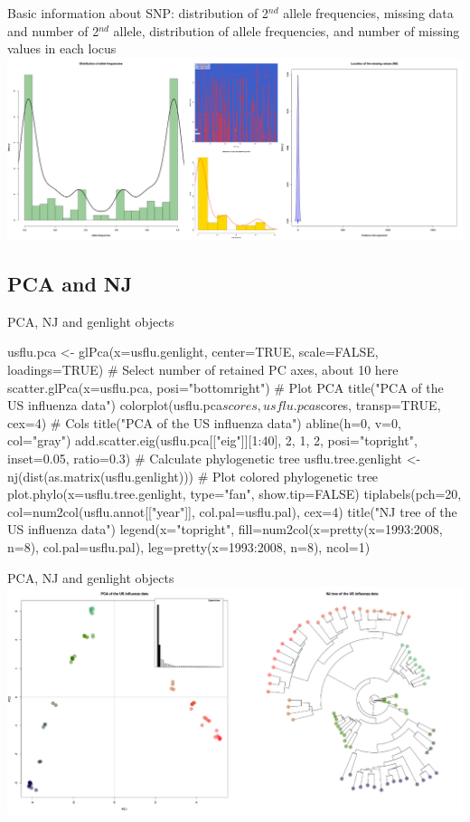 \documentclass[compress, ucs, xelatex, 11pt, xcolor=svgnames,
	hyperref={
		bookmarks=true,
		unicode=true,
		colorlinks=true,
		pdftitle={Molecular data in R},
		plainpages=false,
		pdfauthor={Vojtech Zeisek},
		pdfsubject={Course about phylogeny and evolution in R},
		pdfcreator={XeLaTeX},
		pdfkeywords={R, evolution, phylogeny, molecular data},
		linkcolor=Tomato,
		anchorcolor=SaddleBrown,
		citecolor=Goldenrod,
		filecolor=DarkMagenta,
		menucolor=Sienna,
		urlcolor=DarkTurquoise,
		pdftex},
	url={hyphens, lowtilde} %
	]{beamer}
\begin{document}
\begin{frame}{Basic information about SNP: distribution of 2$^{nd}$ allele frequencies, missing data and number of 2$^{nd}$ allele, distribution of allele frequencies, and number of missing values in each locus}
	\includegraphics[width=\textwidth]{flu_alleles.png}
\end{frame}

\subsection{PCA and NJ}

\begin{frame}[fragile]{PCA, NJ and genlight objects}
	\begin{spluscode}
    usflu.pca <- glPca(x=usflu.genlight, center=TRUE, scale=FALSE,
      loadings=TRUE) # Select number of retained PC axes, about 10 here
    scatter.glPca(x=usflu.pca, posi="bottomright") # Plot PCA
    title("PCA of the US influenza data")
    colorplot(usflu.pca$scores, usflu.pca$scores, transp=TRUE, cex=4) # Cols
    title("PCA of the US influenza data")
    abline(h=0, v=0, col="gray")
    add.scatter.eig(usflu.pca[["eig"]][1:40], 2, 1, 2, posi="topright",
      inset=0.05, ratio=0.3)
    # Calculate phylogenetic tree
    usflu.tree.genlight <- nj(dist(as.matrix(usflu.genlight)))
    # Plot colored phylogenetic tree
    plot.phylo(x=usflu.tree.genlight, type="fan", show.tip=FALSE)
    tiplabels(pch=20, col=num2col(usflu.annot[["year"]],
      col.pal=usflu.pal), cex=4)
    title("NJ tree of the US influenza data")
    legend(x="topright", fill=num2col(x=pretty(x=1993:2008, n=8),
      col.pal=usflu.pal), leg=pretty(x=1993:2008, n=8), ncol=1)
	\end{spluscode}
\end{frame}

\begin{frame}{PCA, NJ and genlight objects}
	\includegraphics[width=\textwidth]{flu_pcoa_nj.png}
\end{frame}
\end{document}
